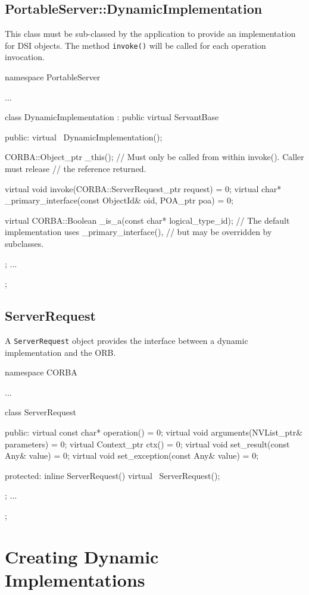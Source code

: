 \documentclass[11pt,twoside,a4paper]{book}
\newcommand{\type}[1]{\texttt{#1}}
\newcommand{\op}[1]{\texttt{#1()}}
\begin{document}
\subsection{PortableServer::DynamicImplementation}

This class must be sub-classed by the application to provide an
implementation for DSI objects. The method \op{invoke} will be called
for each operation invocation.

\begin{cxxlisting}
namespace PortableServer {
  ...

  class DynamicImplementation : public virtual ServantBase {
  public:
    virtual ~DynamicImplementation();

    CORBA::Object_ptr _this();
    // Must only be called from within invoke(). Caller must release
    // the reference returned.

    virtual void invoke(CORBA::ServerRequest_ptr request) = 0;
    virtual char* _primary_interface(const ObjectId& oid, POA_ptr poa) = 0;

    virtual CORBA::Boolean _is_a(const char* logical_type_id);
    // The default implementation uses _primary_interface(),
    // but may be overridden by subclasses.
  };
  ...
};
\end{cxxlisting}


\subsection{ServerRequest}

A \type{ServerRequest} object provides the interface between a dynamic
implementation and the ORB.

\begin{cxxlisting}
namespace CORBA {
  ...

  class ServerRequest {
  public:
    virtual const char* operation() = 0;
    virtual void        arguments(NVList_ptr& parameters) = 0;
    virtual Context_ptr ctx() = 0;
    virtual void        set_result(const Any& value) = 0;
    virtual void        set_exception(const Any& value) = 0;

  protected:
    inline ServerRequest() {}
    virtual ~ServerRequest();
  };
  ...
};
\end{cxxlisting}


\section{Creating Dynamic Implementations}
\end{document}
